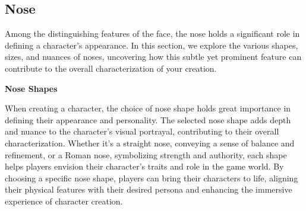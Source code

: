 \hypertarget{nose}{%
\subsection{Nose}\label{nose}}

Among the distinguishing features of the face, the nose holds a
significant role in defining a character's appearance. In this section,
we explore the various shapes, sizes, and nuances of noses, uncovering
how this subtle yet prominent feature can contribute to the overall
characterization of your creation.

\textbf{Nose Shapes}

When creating a character, the choice of nose shape holds great
importance in defining their appearance and personality. The selected
nose shape adds depth and nuance to the character's visual portrayal,
contributing to their overall characterization. Whether it's a straight
nose, conveying a sense of balance and refinement, or a Roman nose,
symbolizing strength and authority, each shape helps players envision
their character's traits and role in the game world. By choosing a
specific nose shape, players can bring their characters to life,
aligning their physical features with their desired persona and
enhancing the immersive experience of character creation.

